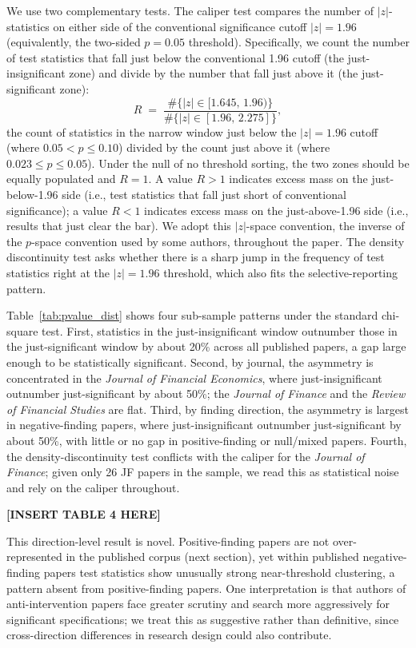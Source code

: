 \documentclass[12pt]{article}
\newcommand{\JF}{\textit{Journal of Finance}}
\newcommand{\RFS}{\textit{Review of Financial Studies}}
\newcommand{\JFE}{\textit{Journal of Financial Economics}}
\begin{document}
We use two complementary tests.  The caliper test \citep*{Brodeur2016}
compares the number of $|z|$-statistics on either side of the conventional
significance cutoff $|z| = 1.96$ (equivalently, the two-sided $p = 0.05$
threshold).  Specifically, we count the number of test statistics that
fall just below the conventional 1.96 cutoff (the just-insignificant
zone) and divide by the number that fall just above it (the
just-significant zone):
\[
  R \;=\; \frac{\#\{|z|\in[1.645,\,1.96)\}}{\#\{|z|\in[1.96,\,2.275]\}},
\]
the count of statistics in the narrow window just below the
$|z|=1.96$ cutoff (where $0.05 < p \le 0.10$) divided by the count
just above it (where $0.023 \le p \le 0.05$).  Under the null of
no threshold sorting, the two zones should be equally populated and
$R = 1$.  A value $R > 1$ indicates excess mass on the just-below-1.96 side
(i.e., test statistics that fall just short of conventional significance);
a value $R < 1$ indicates excess mass on the just-above-1.96 side (i.e.,
results that just clear the bar).  We adopt this $|z|$-space convention, the inverse of the $p$-space convention used by some authors, throughout
the paper.  The density discontinuity test asks whether there is
a sharp jump in the frequency of test statistics right at the $|z|=1.96$
threshold, which also fits the selective-reporting pattern.

Table~\ref{tab:pvalue_dist} shows four sub-sample patterns under
the standard chi-square test.  First, statistics in the
just-insignificant window outnumber those in the just-significant
window by about 20\% across all published papers, a gap large
enough to be statistically significant.  Second, by journal, the
asymmetry is concentrated in the \JFE{}, where just-insignificant
outnumber just-significant by about 50\%; the \JF{} and the
\RFS{} are flat.  Third, by finding direction, the asymmetry is
largest in negative-finding papers, where just-insignificant
outnumber just-significant by about 50\%, with little or no gap
in positive-finding or null/mixed papers.  Fourth, the
density-discontinuity test conflicts with the caliper for the
\JF{}; given only 26 JF papers in the sample, we read this as
statistical noise and rely on the caliper throughout.


\begin{center}
\textbf{[INSERT TABLE 4 HERE]}
\end{center}

This direction-level result is novel.  Positive-finding papers are not
over-represented in the published corpus (next section), yet within
published negative-finding papers test statistics show unusually strong
near-threshold clustering, a pattern absent from positive-finding
papers.  One interpretation is that authors of anti-intervention
papers face greater scrutiny and search more aggressively for
significant specifications; we treat this as suggestive rather than
definitive, since cross-direction differences in research design could
also contribute.
\end{document}
